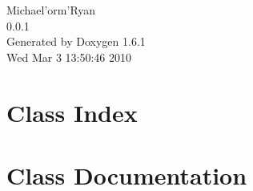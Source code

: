 \documentclass[a4paper]{book}
\begin{document}
\hypersetup{pageanchor=false}
\begin{titlepage}
\vspace*{7cm}
\begin{center}
{\Large Michael'orm'Ryan \\[1ex]\large 0.0.1 }\\
\vspace*{1cm}
{\large Generated by Doxygen 1.6.1}\\
\vspace*{0.5cm}
{\small Wed Mar 3 13:50:46 2010}\\
\end{center}
\end{titlepage}
\clearemptydoublepage
{}
\tableofcontents
\clearemptydoublepage
{}
\hypersetup{pageanchor=true}
\chapter{Class Index}

\chapter{Class Documentation}
















\printindex
\end{document}
